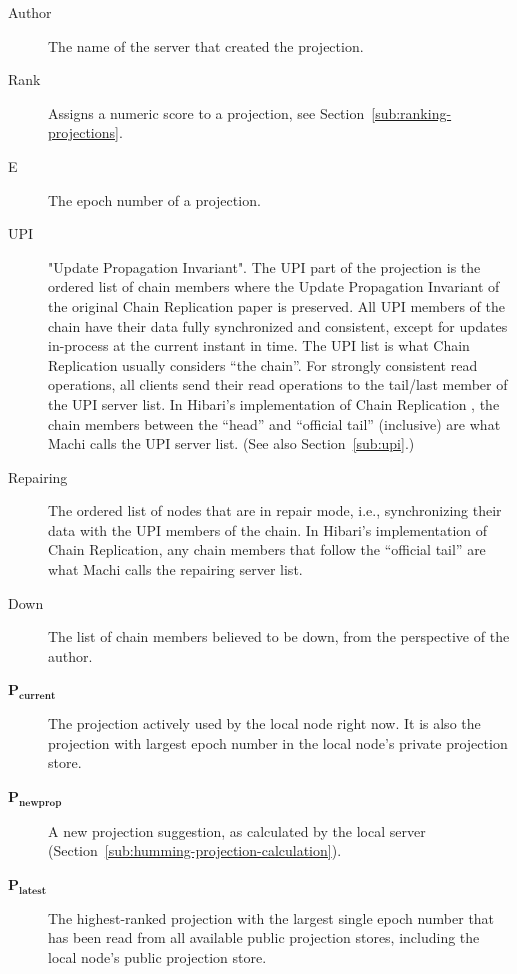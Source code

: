 \documentclass[preprint,10pt]{sigplanconf}
\begin{document}
\begin{description}
\item[Author] The name of the server that created the projection.

\item[Rank] Assigns a numeric score to a projection, see
  Section~\ref{sub:ranking-projections}.

\item[E] The epoch number of a projection.

\item[UPI] "Update Propagation Invariant".  The UPI part of the projection
  is the ordered list of chain members where the
  Update Propagation Invariant of the original Chain Replication paper
  \cite{chain-replication} is preserved.  
  All UPI  members of the chain have their data fully synchronized and
  consistent, except for updates in-process at the current instant in time.
  The UPI list is what Chain Replication usually considers ``the
  chain''.  For strongly consistent read operations, all clients
  send their read operations to the tail/last member of the UPI server
  list.
  In Hibari's implementation of Chain Replication
  \cite{cr-theory-and-practice}, the chain members between the
  ``head'' and ``official tail'' (inclusive) are what Machi calls the
  UPI server list.  (See also Section~\ref{sub:upi}.)

\item[Repairing] The ordered list of nodes that are in repair mode,
  i.e., synchronizing their data with the UPI members of the chain.
  In Hibari's implementation of Chain Replication, any chain members
  that follow the ``official tail'' are what Machi calls the repairing
  server list.

\item[Down] The list of chain members believed to be down, from the
  perspective of the author.

\item[$\mathbf{P_{current}}$] The projection actively used by the local
  node right now.  It is also the projection with largest
  epoch number in the local node's private projection store.

\item[$\mathbf{P_{newprop}}$] A new projection suggestion, as
  calculated by the local server
  (Section~\ref{sub:humming-projection-calculation}).

\item[$\mathbf{P_{latest}}$] The highest-ranked projection with the largest
  single epoch number that has been read from all available public
  projection stores, including the local node's public projection store.


\end{description}
\end{document}
